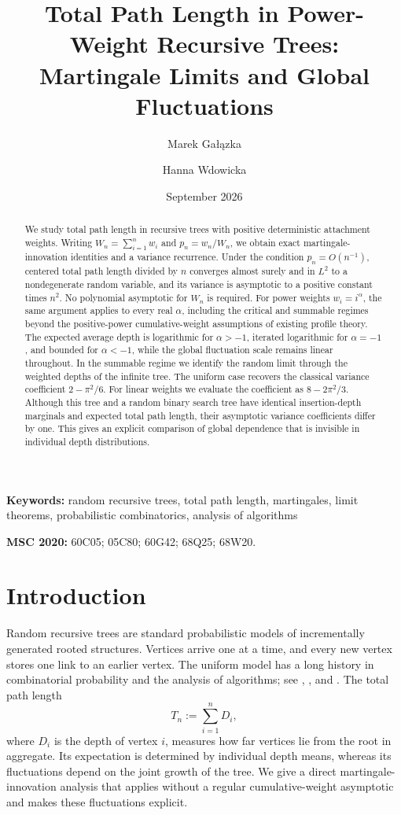 \documentclass[11pt,a4paper]{article}
\title{\bfseries Total Path Length in Power-Weight Recursive Trees:\\
Martingale Limits and Global Fluctuations}
\author[1]{Marek Gałązka}
\author[2]{Hanna Wdowicka}
\affil[1]{Faculty of Mathematics and Computer Science, Adam Mickiewicz University, Poznań, Poland}
\affil[2]{Department of Statistics, Poznań University of Economics and Business, Poland}
\date{September 2026}
\newcommand{\1}{\mathbf{1}}
\begin{document}
\maketitle
\begin{abstract}
We study total path length in recursive trees with positive deterministic attachment weights.
Writing $W_n=\sum_{i=1}^n w_i$ and $p_n=w_n/W_n$, we obtain exact martingale-innovation identities and a variance recurrence.
Under the condition $p_n=O(n^{-1})$, centered total path length divided by $n$ converges almost surely and in $L^2$ to a nondegenerate random variable, and its variance is asymptotic to a positive constant times $n^2$.
No polynomial asymptotic for $W_n$ is required.
For power weights $w_i=i^\alpha$, the same argument applies to every real $\alpha$, including the critical and summable regimes beyond the positive-power cumulative-weight assumptions of existing profile theory.
The expected average depth is logarithmic for $\alpha>-1$, iterated logarithmic for $\alpha=-1$, and bounded for $\alpha<-1$, while the global fluctuation scale remains linear throughout.
In the summable regime we identify the random limit through the weighted depths of the infinite tree.
The uniform case recovers the classical variance coefficient $2-\pi^2/6$.
For linear weights we evaluate the coefficient as $8-2\pi^2/3$.
Although this tree and a random binary search tree have identical insertion-depth marginals and expected total path length, their asymptotic variance coefficients differ by one.
This gives an explicit comparison of global dependence that is invisible in individual depth distributions.
\end{abstract}

\noindent\textbf{Keywords:} random recursive trees, total path length, martingales, limit theorems, probabilistic combinatorics, analysis of algorithms

\smallskip

\noindent\textbf{MSC 2020:} 60C05; 05C80; 60G42; 68Q25; 68W20.

\section{Introduction}\label{sec:intro}
Random recursive trees are standard probabilistic models of incrementally generated rooted structures.
Vertices arrive one at a time, and every new vertex stores one link to an earlier vertex.
The uniform model has a long history in combinatorial probability and the analysis of algorithms; see
\citet{Szymanski1990}, \citet{SmytheMahmoud1995}, and \citet{Drmota2009}.
The total path length
\[
T_n:=\sum_{i=1}^n D_i,
\]
where $D_i$ is the depth of vertex $i$, measures how far vertices lie from the root in aggregate.
Its expectation is determined by individual depth means, whereas its fluctuations depend on the joint growth of the tree.
We give a direct martingale-innovation analysis that applies without a regular cumulative-weight asymptotic and makes these fluctuations explicit.
\end{document}
